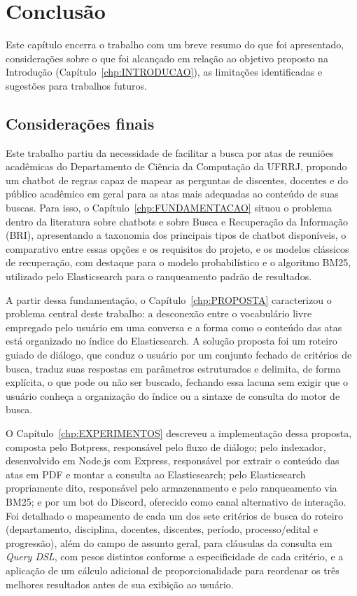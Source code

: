 \chapter{Conclusão}\label{chp:CONCLUSAO}

Este capítulo encerra o trabalho com um breve resumo do que foi apresentado, considerações sobre o que foi alcançado em relação ao objetivo proposto na Introdução (Capítulo~\ref{chp:INTRODUCAO}), as limitações identificadas e sugestões para trabalhos futuros.

\section{Considerações finais}

Este trabalho partiu da necessidade de facilitar a busca por atas de reuniões acadêmicas do Departamento de Ciência da Computação da UFRRJ, propondo um chatbot de regras capaz de mapear as perguntas de discentes, docentes e do público acadêmico em geral para as atas mais adequadas ao conteúdo de suas buscas. Para isso, o Capítulo~\ref{chp:FUNDAMENTACAO} situou o problema dentro da literatura sobre chatbots e sobre Busca e Recuperação da Informação (BRI), apresentando a taxonomia dos principais tipos de chatbot disponíveis, o comparativo entre essas opções e os requisitos do projeto, e os modelos clássicos de recuperação, com destaque para o modelo probabilístico e o algoritmo BM25, utilizado pelo Elasticsearch para o ranqueamento padrão de resultados.

A partir dessa fundamentação, o Capítulo~\ref{chp:PROPOSTA} caracterizou o problema central deste trabalho: a desconexão entre o vocabulário livre empregado pelo usuário em uma conversa e a forma como o conteúdo das atas está organizado no índice do Elasticsearch. A solução proposta foi um roteiro guiado de diálogo, que conduz o usuário por um conjunto fechado de critérios de busca, traduz suas respostas em parâmetros estruturados e delimita, de forma explícita, o que pode ou não ser buscado, fechando essa lacuna sem exigir que o usuário conheça a organização do índice ou a sintaxe de consulta do motor de busca.

O Capítulo~\ref{chp:EXPERIMENTOS} descreveu a implementação dessa proposta, composta pelo Botpress, responsável pelo fluxo de diálogo; pelo indexador, desenvolvido em Node.js com Express, responsável por extrair o conteúdo das atas em PDF e montar a consulta ao Elasticsearch; pelo Elasticsearch propriamente dito, responsável pelo armazenamento e pelo ranqueamento via BM25; e por um bot do Discord, oferecido como canal alternativo de interação. Foi detalhado o mapeamento de cada um dos sete critérios de busca do roteiro (departamento, disciplina, docentes, discentes, período, processo/edital e progressão), além do campo de assunto geral, para cláusulas da consulta em \textit{Query DSL}, com pesos distintos conforme a especificidade de cada critério, e a aplicação de um cálculo adicional de proporcionalidade para reordenar os três melhores resultados antes de sua exibição ao usuário.

